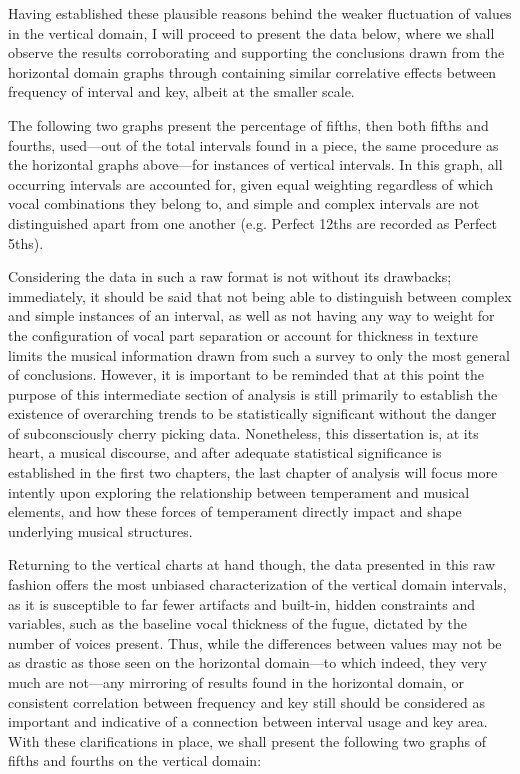 Having established these plausible reasons behind the weaker fluctuation
of values in the vertical domain, I will proceed to present the data
below, where we shall observe the results corroborating and supporting
the conclusions drawn from the horizontal domain graphs through
containing similar correlative effects between frequency of interval and
key, albeit at the smaller scale.

    The following two graphs present the percentage of fifths, then both
fifths and fourths, used---out of the total intervals found in a
piece, the same procedure as the horizontal graphs above---for
instances of vertical intervals. In this graph, all occurring intervals
are accounted for, given equal weighting regardless of which vocal
combinations they belong to, and simple and complex intervals are not
distinguished apart from one another (e.g. Perfect 12ths are recorded as
Perfect 5ths).

Considering the data in such a raw format is not without its drawbacks;
immediately, it should be said that not being able to distinguish
between complex and simple instances of an interval, as well as not
having any way to weight for the configuration of vocal part separation
or account for thickness in texture limits the musical information drawn
from such a survey to only the most general of conclusions. However, it
is important to be reminded that at this point the purpose of this
intermediate section of analysis is still primarily to establish the
existence of overarching trends to be statistically significant without
the danger of subconsciously cherry picking data. Nonetheless, this
dissertation is, at its heart, a musical discourse, and after adequate
statistical significance is established in the first two chapters, the
last chapter of analysis will focus more intently upon exploring the
relationship between temperament and musical elements, and how these
forces of temperament directly impact and shape underlying musical
structures.

Returning to the vertical charts at hand though, the data presented in
this raw fashion offers the most unbiased characterization of the
vertical domain intervals, as it is susceptible to far fewer artifacts
and built-in, hidden constraints and variables, such as the baseline
vocal thickness of the fugue, dictated by the number of voices present.
Thus, while the differences between values may not be as drastic as
those seen on the horizontal domain---to which indeed, they very
much are not---any mirroring of results found in the horizontal
domain, or consistent correlation between frequency and key still should
be considered as important and indicative of a connection between
interval usage and key area. With these clarifications in place, we
shall present the following two graphs of fifths and fourths on the
vertical domain:


